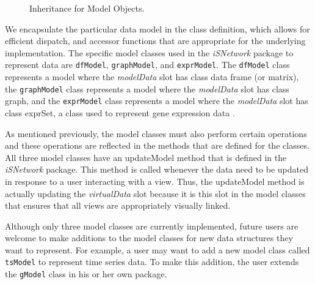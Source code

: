 \documentclass{article}[11pt]
\newcommand{\Rfunction}[1]{{\textsf{#1}}}
\newcommand{\Rpackage}[1]{{\textit{#1}}}
\newcommand{\Rslot}[1]{\textsl{#1}}
\newcommand{\Rclass}[1]{\texttt{#1}}
\begin{document}

\begin{figure}[ht]
  \begin{center}
    \caption{ Inheritance for Model Objects. }
    \label{Fig:Model}
  \end{center}
\end{figure}

We encapsulate the particular data model in the class definition, which allows
for efficient dispatch, and accessor functions that are appropriate for the
underlying implementation.  The specific model classes used in the
\Rpackage{iSNetwork} package to represent data are \Rclass{dfModel},
\Rclass{graphModel}, and \Rclass{exprModel}.  The \Rclass{dfModel} class
represents a model where the \Rslot{modelData} slot has class data frame (or
matrix), the \Rclass{graphModel} class represents a model where the
\Rslot{modelData} slot has class graph, and the \Rclass{exprModel} class
represents a model where the \Rslot{modelData} slot has class exprSet, a class
used to represent gene expression data \cite{BioC}.

As mentioned previously, the model classes must also perform certain
operations and these operations are reflected in the methods that are defined
for the classes.  All three model classes have an \Rfunction{updateModel}
method that is defined in the \Rpackage{iSNetwork} package.  This method is
called whenever the data need to be updated in response to a user interacting
with a view.  Thus, the \Rfunction{updateModel} method is actually updating the
\Rslot{virtualData} slot because it is this slot in the model classes
that ensures that all views are appropriately visually linked.  

Although only three model classes are currently implemented, future
users are welcome to make additions to the model classes for new data
structures they want to represent.  For example, a user may want to add a new
model class called \Rclass{tsModel} to represent time series data.
To make this addition, the user extends the \Rclass{gModel} class in his or
her own package. 
\end{document}
